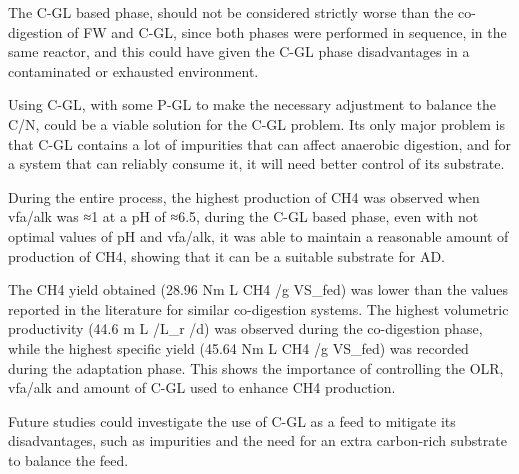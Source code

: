 \documentclass[12pt, a4paper, oneside]{report}
\begin{document}
The C-GL based phase, should not be considered strictly worse than the co-digestion of FW and C-GL, since both phases were performed in sequence, in the same reactor, and this could have given the C-GL phase disadvantages in a contaminated or exhausted environment.

Using C-GL, with some P-GL to make the necessary adjustment to balance the C/N, could be a viable solution for the C-GL problem. Its only major problem is that C-GL contains a lot of impurities that can affect anaerobic digestion, and for a system that can reliably consume it, it will need better control of its substrate.

During the entire process, the highest production of CH4 was observed when vfa/alk was ≈1 at a pH of ≈6.5, during the C-GL based phase, even with not optimal values of pH and vfa/alk, it was able to maintain a reasonable amount of production of CH4, showing that it can be a suitable substrate for AD.

The CH4 yield obtained (28.96 Nm L CH4 /g VS_fed) was lower than the values reported in the literature for similar co-digestion systems. The highest volumetric productivity (44.6 m L /L_r /d) was observed during the co-digestion phase, while the highest specific yield (45.64 Nm L CH4 /g VS_fed) was recorded during the adaptation phase. This shows the importance of controlling the OLR, vfa/alk and amount of C-GL used to enhance CH4 production.

Future studies could investigate the use of C-GL as a feed to mitigate its disadvantages, such as impurities and the need for an extra carbon-rich substrate to balance the feed.
\clearpage{}

\printbibliography[heading=bibintoc, title={References}]
\end{document}
